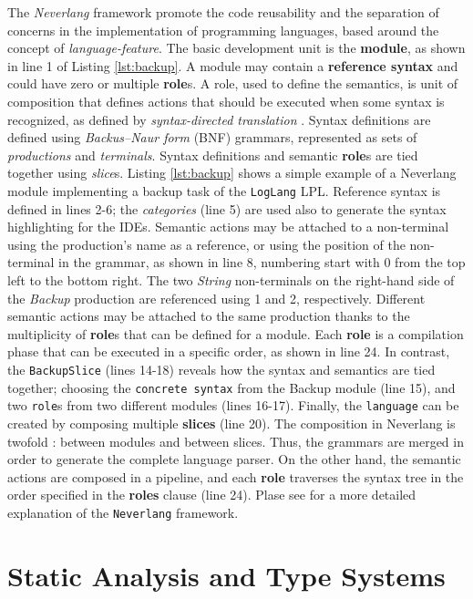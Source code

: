 The \textit{Neverlang} \cite{Cazzola12c, Cazzola13e, Cazzola15c} framework promote the code reusability and the separation of concerns in the implementation of programming languages, based around the concept of \textit{language-feature}.
The basic development unit is the \textbf{module}, as shown in line 1 of Listing \ref{lst:backup}.
A module may contain a \textbf{reference syntax} and could have zero or multiple \textbf{role}s. A role, used to define the semantics, is unit of composition that defines actions that should be executed when some syntax is recognized, as defined by \textit{syntax-directed translation} \cite{Aho86}.
Syntax definitions are defined using \textit{Backus–Naur form} (BNF) grammars, represented as sets of \textit{productions} and \textit{terminals}.
Syntax definitions and semantic \textbf{role}s are tied together using \textit{slice}s.
Listing \ref{lst:backup} shows a simple example of a Neverlang module implementing a backup task of the \texttt{LogLang} LPL. Reference syntax is defined in lines 2-6; the \textit{categories} (line 5) are used also to generate the syntax highlighting for the IDEs.
Semantic actions may be attached to a non-terminal using the production's name as a reference, or using the position of the non-terminal in the grammar, as shown in line 8, numbering start with 0 from the top left to the bottom right.
The two \textit{String} non-terminals on the right-hand side of the \textit{Backup} production are referenced using 1 and 2, respectively.
Different semantic actions may be attached to the same production thanks to the multiplicity of \textbf{role}s that can be defined for a module. Each \textbf{role} is a compilation phase that can be executed in a specific order, as shown in line 24.
In contrast, the \texttt{BackupSlice} (lines 14-18) reveals how the syntax and semantics are tied together; choosing the \texttt{concrete syntax} from the Backup module (line 15), and two \texttt{role}s from two different modules (lines 16-17).
Finally, the \texttt{language} can be created by composing multiple \textbf{slices} (line 20).
The composition in Neverlang is twofold \cite{Cazzola20}: between modules and between slices. Thus, the grammars are merged in order to generate the complete language parser. On the other hand, the semantic actions are composed in a pipeline, and each \textbf{role} traverses the syntax tree in the order specified in the \textbf{roles} clause (line 24).
Plase see \cite{Cazzola15c} for a more detailed explanation of the \texttt{Neverlang} framework.


\section{Static Analysis and Type Systems}\label{sec:SaticAnalysisAndTypeSystems}

